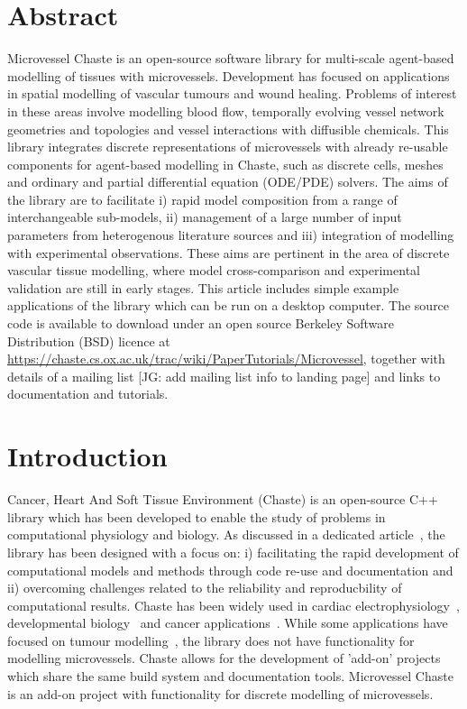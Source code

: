 \documentclass[10pt,letterpaper]{article}
\begin{document}
\section*{Abstract}
Microvessel Chaste is an open-source software library for multi-scale agent-based modelling of tissues with microvessels. Development has focused on applications in spatial modelling of vascular tumours and wound healing. Problems of interest in these areas involve modelling blood flow, temporally evolving vessel network geometries and topologies and vessel interactions with diffusible chemicals. This library integrates discrete representations of microvessels with already re-usable components for agent-based modelling in Chaste, such as discrete cells, meshes and ordinary and partial differential equation (ODE/PDE) solvers. The aims of the library are to facilitate i) rapid model composition from a range of interchangeable sub-models, ii) management of a large number of input parameters from heterogenous literature sources and iii) integration of modelling with experimental observations. These aims are pertinent in the area of discrete vascular tissue modelling, where model cross-comparison and experimental validation are still in early stages. This article includes simple example applications of the library which can be run on a desktop computer. The source code is available to download under an open source Berkeley Software Distribution (BSD) licence at \url{https://chaste.cs.ox.ac.uk/trac/wiki/PaperTutorials/Microvessel}, together with details of a mailing list [JG: add mailing list info to landing page] and links to documentation and tutorials.

\linenumbers

\section*{Introduction}
Cancer, Heart And Soft Tissue Environment (Chaste) is an open-source C++ library which has been developed to enable the study of problems in computational physiology and biology. As discussed in a dedicated article~\cite{Mirams2013}, the library has been designed with a focus on: i) facilitating the rapid development of computational models and methods through code re-use and documentation and ii) overcoming challenges related to the reliability and reproducbility of computational results. Chaste has been widely used in cardiac electrophysiology~\cite{Cooper2015}, developmental biology~\cite{Tetley2016} and cancer applications~\cite{Dunn2016}. While some applications have focused on tumour modelling~\cite{Figueredo2013}, the library does not have functionality for modelling microvessels. Chaste allows for the development of 'add-on' projects which share the same build system and documentation tools. Microvessel Chaste is an add-on project with functionality for discrete modelling of microvessels.
\end{document}
